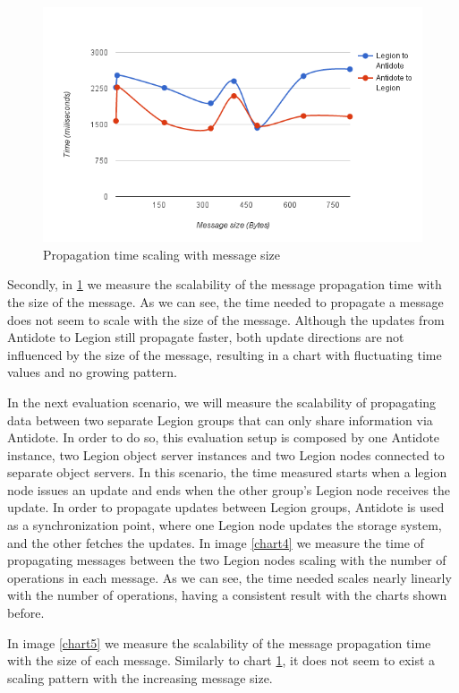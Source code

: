 \begin{figure}[h]
\centering
\includegraphics[scale=0.7]{files/chart2.png}
\caption{Propagation time scaling with message size}
\label{chart2}
\end{figure}

Secondly, in \ref{chart2} we  measure the scalability of the message propagation time with the size of the message. As we can see, the time needed to propagate a message does not seem to scale with the size of the message. Although the updates from Antidote to Legion still propagate faster, both update directions are not influenced by the size of the message, resulting in a chart with fluctuating time values and no growing pattern.\par
	In the next evaluation scenario, we will measure the scalability of propagating data between two separate Legion groups that can only share information via Antidote. In order to do so, this evaluation setup is composed by one Antidote instance, two Legion object server instances and two Legion nodes connected to separate object servers. In this scenario, the time measured starts when a legion node issues an update and ends when the other group's Legion node receives the update. In order to propagate updates between Legion groups, Antidote is used as a synchronization point, where one Legion node updates the storage system, and the other fetches the updates. In image \ref{chart4} we measure the time of propagating messages between the two Legion nodes scaling with the number of operations in each message. As we can see, the time needed scales nearly linearly with the number of operations, having a consistent result with the charts shown before.\par
	In image \ref{chart5} we measure the scalability of the message propagation time with the size of each message. Similarly to chart \ref{chart2}, it does not seem to exist a scaling pattern with the increasing message size.

